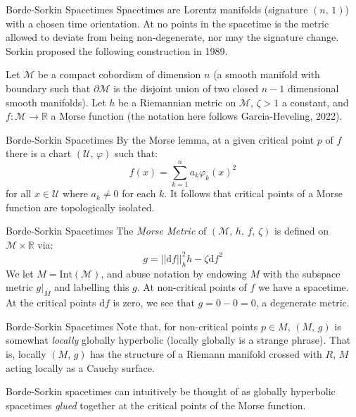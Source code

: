\documentclass{beamer}
\begin{document}
    \begin{frame}{Borde-Sorkin Spacetimes}
        Spacetimes are Lorentz manifolds (signature $(n,\,1)$) with a chosen
        time orientation. At no points in the spacetime is the metric allowed
        to deviate from being non-degenerate, nor may the signature change.
        Sorkin proposed the following construction in 1989.
        \par\hfill\par
        Let $\mathcal{M}$ be a compact cobordism of dimension $n$
        (a smooth manifold with boundary such that $\partial\mathcal{M}$ is the
        disjoint union of two closed $n-1$ dimensional smooth manifolds). Let
        $h$ be a Riemannian metric on $\mathcal{M}$, $\zeta>1$ a constant, and
        $f:\mathcal{M}\rightarrow\mathbb{R}$ a Morse function
        (the notation here follows Garcia-Heveling, 2022).
    \end{frame}
    \begin{frame}{Borde-Sorkin Spacetimes}
        By the Morse lemma, at a given critical point $p$ of $f$ there is a
        chart $(\mathcal{U},\,\varphi)$ such that:
        \begin{equation}
    	    f(x)=\sum_{k=1}^{n}a_{k}\varphi_{k}(x)^{2}
        \end{equation}
        for all $x\in\mathcal{U}$ where $a_{k}\ne{0}$ for each $k$. It follows
        that critical points of a Morse function are topologically isolated.
    \end{frame}
    \begin{frame}{Borde-Sorkin Spacetimes}
        The \textit{Morse Metric} of $(\mathcal{M},\,h,\,f,\,\zeta)$ is
        defined on $\mathcal{M}\times\mathbb{R}$ via:
        \begin{equation}
            g=||\textrm{d}f||^{2}_{h}h-\zeta\textrm{d}f^{2}
        \end{equation}
        We let $M=\textrm{Int}(\mathcal{M})$, and
        abuse notation by endowing $M$ with the subspace metric
        $g|_{M}$ and labelling this $g$. At non-critical points of $f$ we have
        a spacetime. At the critical points $\textrm{d}f$ is zero, we see that
        $g=0-0=0$, a degenerate metric.
    \end{frame}
    \begin{frame}{Borde-Sorkin Spacetimes}
        Note that, for non-critical points $p\in{M}$, $(M,\,g)$ is somewhat
        \textit{locally} globally hyperbolic (locally globally is a strange
        phrase). That is, locally $(M,\,g)$ has the structure of a Riemann
        manifold crossed with $R$, $M$ acting locally as a Cauchy surface.
        \par\hfill\par
        Borde-Sorkin spacetimes can intuitively be thought of as
        globally hyperbolic spacetimes \textit{glued} together at the
        critical points of the Morse function.
    \end{frame}
\end{document}
